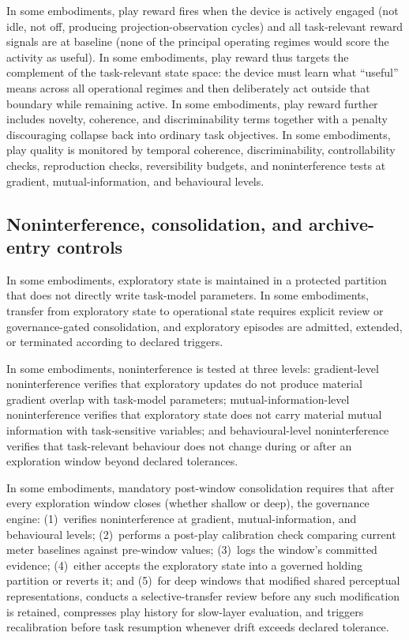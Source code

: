 \documentclass[a4paper,12pt]{article}
\begin{document}
In some embodiments, play reward fires when the device is actively
engaged (not idle, not off, producing projection-observation cycles)
and all task-relevant reward signals are at baseline (none of the
principal operating regimes would score the activity as useful). In
some embodiments, play reward thus targets the complement of the
task-relevant state space: the device must learn what ``useful'' means
across all operational regimes and then deliberately act outside that
boundary while remaining active. In some embodiments, play reward
further includes novelty, coherence, and discriminability terms
together with a penalty discouraging collapse back into ordinary task
objectives. In some embodiments, play quality is monitored by temporal
coherence, discriminability, controllability checks, reproduction
checks, reversibility budgets, and noninterference tests at gradient,
mutual-information, and behavioural levels.

\subsection{Noninterference, consolidation, and archive-entry
  controls}


In some embodiments, exploratory state is maintained in a protected
partition that does not directly write task-model parameters. In some
embodiments, transfer from exploratory state to operational state
requires explicit review or governance-gated consolidation, and
exploratory episodes are admitted, extended, or terminated according
to declared triggers.

In some embodiments, noninterference is tested at three levels:
gradient-level noninterference verifies that exploratory updates do
not produce material gradient overlap with task-model parameters;
mutual-information-level noninterference verifies that exploratory
state does not carry material mutual information with task-sensitive
variables; and behavioural-level noninterference verifies that
task-relevant behaviour does not change during or after an
exploration window beyond declared tolerances.

In some embodiments, mandatory post-window consolidation requires
that after every exploration window closes (whether shallow or deep),
the governance engine: (1)~verifies noninterference at gradient,
mutual-information, and behavioural levels; (2)~performs a post-play
calibration check comparing current meter baselines against
pre-window values; (3)~logs the window's committed evidence;
(4)~either accepts the exploratory state into a governed holding
partition or reverts it; and (5)~for deep windows that modified shared
perceptual representations, conducts a selective-transfer review
before any such modification is retained, compresses play history for
slow-layer evaluation, and triggers recalibration before task
resumption whenever drift exceeds declared tolerance.
\end{document}
